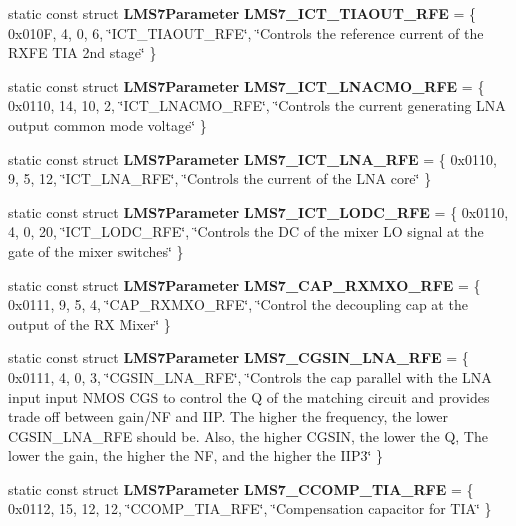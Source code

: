 \begin{DoxyCompactItemize}
\item 
static const struct {\bf L\+M\+S7\+Parameter} {\bf L\+M\+S7\+\_\+\+I\+C\+T\+\_\+\+T\+I\+A\+O\+U\+T\+\_\+\+R\+FE} = \{ 0x010\+F, 4, 0, 6, \char`\"{}\+I\+C\+T\+\_\+\+T\+I\+A\+O\+U\+T\+\_\+\+R\+F\+E\char`\"{}, \char`\"{}\+Controls the reference current of the R\+X\+F\+E T\+I\+A 2nd stage\char`\"{} \}
\item 
static const struct {\bf L\+M\+S7\+Parameter} {\bf L\+M\+S7\+\_\+\+I\+C\+T\+\_\+\+L\+N\+A\+C\+M\+O\+\_\+\+R\+FE} = \{ 0x0110, 14, 10, 2, \char`\"{}\+I\+C\+T\+\_\+\+L\+N\+A\+C\+M\+O\+\_\+\+R\+F\+E\char`\"{}, \char`\"{}\+Controls the current generating L\+N\+A output common mode voltage\char`\"{} \}
\item 
static const struct {\bf L\+M\+S7\+Parameter} {\bf L\+M\+S7\+\_\+\+I\+C\+T\+\_\+\+L\+N\+A\+\_\+\+R\+FE} = \{ 0x0110, 9, 5, 12, \char`\"{}\+I\+C\+T\+\_\+\+L\+N\+A\+\_\+\+R\+F\+E\char`\"{}, \char`\"{}\+Controls the current of the L\+N\+A core\char`\"{} \}
\item 
static const struct {\bf L\+M\+S7\+Parameter} {\bf L\+M\+S7\+\_\+\+I\+C\+T\+\_\+\+L\+O\+D\+C\+\_\+\+R\+FE} = \{ 0x0110, 4, 0, 20, \char`\"{}\+I\+C\+T\+\_\+\+L\+O\+D\+C\+\_\+\+R\+F\+E\char`\"{}, \char`\"{}\+Controls the D\+C of the mixer L\+O signal at the gate of the mixer switches\char`\"{} \}
\item 
static const struct {\bf L\+M\+S7\+Parameter} {\bf L\+M\+S7\+\_\+\+C\+A\+P\+\_\+\+R\+X\+M\+X\+O\+\_\+\+R\+FE} = \{ 0x0111, 9, 5, 4, \char`\"{}\+C\+A\+P\+\_\+\+R\+X\+M\+X\+O\+\_\+\+R\+F\+E\char`\"{}, \char`\"{}\+Control the decoupling cap at the output of the R\+X Mixer\char`\"{} \}
\item 
static const struct {\bf L\+M\+S7\+Parameter} {\bf L\+M\+S7\+\_\+\+C\+G\+S\+I\+N\+\_\+\+L\+N\+A\+\_\+\+R\+FE} = \{ 0x0111, 4, 0, 3, \char`\"{}\+C\+G\+S\+I\+N\+\_\+\+L\+N\+A\+\_\+\+R\+F\+E\char`\"{}, \char`\"{}\+Controls the cap parallel with the L\+N\+A input input N\+M\+O\+S C\+G\+S to control the Q of the matching circuit and provides trade off between gain/\+N\+F and I\+I\+P. The higher the frequency, the lower C\+G\+S\+I\+N\+\_\+\+L\+N\+A\+\_\+\+R\+F\+E should be. Also, the higher C\+G\+S\+I\+N, the lower the Q, The lower the gain, the higher the N\+F, and the higher the I\+I\+P3\char`\"{} \}
\item 
static const struct {\bf L\+M\+S7\+Parameter} {\bf L\+M\+S7\+\_\+\+C\+C\+O\+M\+P\+\_\+\+T\+I\+A\+\_\+\+R\+FE} = \{ 0x0112, 15, 12, 12, \char`\"{}\+C\+C\+O\+M\+P\+\_\+\+T\+I\+A\+\_\+\+R\+F\+E\char`\"{}, \char`\"{}\+Compensation capacitor for T\+I\+A\char`\"{} \}

\end{DoxyCompactItemize}
